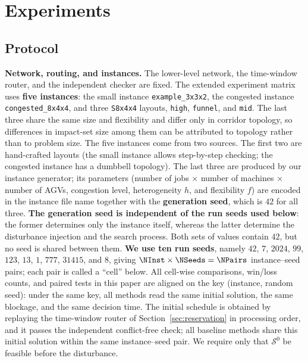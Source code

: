 \section{Experiments}
\label{sec:experiments}

\subsection{Protocol}
\label{sec:protocol}

\textbf{Network, routing, and instances.}
The lower-level network, the time-window router, and the independent checker are fixed. The extended experiment matrix uses \textbf{five instances}:
the small instance \texttt{example\_3x3x2}, the congested instance \texttt{congested\_8x4x4},
and three \texttt{S8x4x4} layouts, \texttt{high}, \texttt{funnel}, and \texttt{mid}.
The last three share the same size and flexibility and differ only in corridor topology, so differences in impact-set size among them can be attributed to topology rather than to problem size.
The five instances come from two sources. The first two are hand-crafted layouts (the small instance allows step-by-step checking; the congested instance has a dumbbell topology). The last three are produced by our instance
generator; its parameters (number of jobs \(\times\) number of machines \(\times\) number of AGVs, congestion level, heterogeneity \(h\), and flexibility \(f\))
are encoded in the instance file name together with the \textbf{generation seed}, which is \(42\) for all three.
\textbf{The generation seed is independent of the run seeds used below}: the former determines only the instance itself, whereas the latter determine the disturbance injection
and the search process. Both sets of values contain \(42\), but no seed is shared between them.
\textbf{We use ten run seeds}, namely \(42\), \(7\), \(2024\), \(99\), \(123\), \(13\), \(1\),
\(777\), \(31415\), and \(8\), giving \(\NInst\times\NSeeds=\NPairs\) instance--seed pairs; each pair is called a ``cell'' below.
All cell-wise comparisons, win/loss counts, and paired tests in this paper are aligned on the key (instance, random seed):
under the same key, all methods read the same initial solution, the same blockage, and the same decision time.
The initial schedule is obtained by replaying the time-window router of Section~\ref{sec:reservation} in processing order,
and it passes the independent conflict-free check; all baseline methods share this initial solution within the same instance--seed pair.
We require only that \(\mathcal{S}^0\) be feasible before the disturbance.

